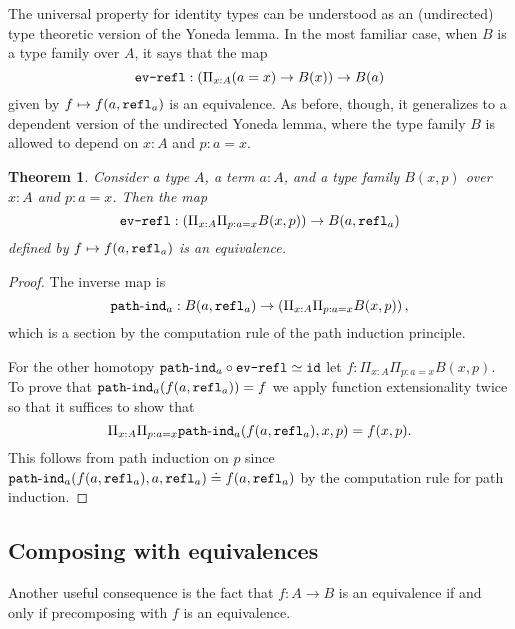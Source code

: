 \documentclass{amsart}
\theoremstyle{theorem}
\newtheorem*{thm}{Theorem}
\theoremstyle{definition}
\theoremstyle{remark}
\newcommand{\0}{\mathbbe{0}}
\newcommand{\1}{\mathbbe{1}}
\newcommand{\2}{\mathbbe{2}}
\newcommand{\3}{\mathbbe{3}}
\newcommand{\4}{\mathbbe{4}}
\newcommand{\term}[1]{{\textup{\texttt{#1}}}}
\newcommand{\id}{\term{id}}
\newcommand{\refl}{\term{refl}}
\newcommand{\pathind}{\term{path}\text{-}\term{ind}}
\begin{document}
The universal property for identity types can be understood as an (undirected) type theoretic version of the Yoneda lemma. In the most familiar case, when $B$ is a type family over $A$, it says that the map
\[ \term{ev-refl} : \left( \Pi_{x:A}(a=x) \to B(x) \right) \to B(a)\]
given by $f \mapsto f(a,\refl_a)$ is an equivalence. As before, though, it generalizes to a dependent version of the undirected Yoneda lemma, where the type family $B$ is allowed to depend on $x :A$ and $p: a =x$.

\begin{thm} Consider a type $A$, a term $a :A$, and a type family $B(x,p)$ over $x:A$ and $p: a=x$. Then the map
\[ \term{ev-refl} : \left( \Pi_{x:A}\Pi_{p:a=x} B(x,p) \right) \to B(a,\refl_a)\]
defined by $f \mapsto f(a,\refl_a)$ is an equivalence.
\end{thm}
\begin{proof}
The inverse map is
\[ \pathind_a : B(a,\refl_a) \to \left( \Pi_{x:A}\Pi_{p:a=x} B(x,p) \right),\]
which is a section by the computation rule of the path induction principle.

For the other homotopy $\pathind_a \circ \term{ev-refl} \simeq \id$ let $f : \Pi_{x:A} \Pi_{p:a=x}B(x,p)$. To prove that 
$\pathind_a(f(a,\refl_a)) = f$ we apply function extensionality twice so that it suffices to show that
\[ \Pi_{x:A} \Pi_{p:a=x} \pathind_a(f(a,\refl_a),x,p) = f(x,p).\] This follows from path induction on $p$ since $\pathind_a(f(a,\refl_a),a,\refl_a) \doteq f(a,\refl_a)$ by the computation rule for path induction.
\end{proof}

\subsection*{Composing with equivalences}

Another useful consequence is the fact that $f : A \to B$ is an equivalence if and only if precomposing with $f$ is an equivalence.
\end{document}
